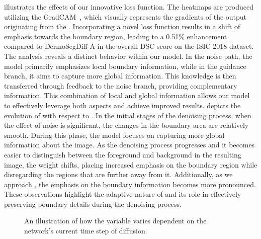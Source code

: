 \documentclass[runningheads]{llncs}
\begin{document}
 illustrates the effects of our innovative loss function. The heatmaps are produced utilizing the GradCAM~\cite{selvaraju2017grad}, which visually represents the gradients of the output originating from the . Incorporating a novel loss function results in a shift of emphasis towards the boundary region, leading to a 0.51\% enhancement compared to DermoSegDiff-A in the overall DSC score on the ISIC 2018 dataset. The analysis reveals a distinct behavior within our model. In the noise path, the model primarily emphasizes local boundary information, while in the guidance branch, it aims to capture more global information. This knowledge is then transferred through feedback to the noise branch, providing complementary information. This combination of local and global information allows our model to effectively leverage both aspects and achieve improved results.  depicts the evolution of  with respect to . In the initial stages of the denoising process, when the effect of noise is significant, the changes in the boundary area are relatively smooth. During this phase, the model focuses on capturing more global information about the image. As the denoising process progresses and it becomes easier to distinguish between the foreground and background in the resulting image, the weight shifts, placing increased emphasis on the boundary region while disregarding the regions that are further away from it. Additionally, as we approach , the emphasis on the boundary information becomes more pronounced. These observations highlight the adaptive nature of  and its role in effectively preserving boundary details during the denoising process.
\begin{figure}[!t]
    \centering
    
    \caption{An illustration of how the  variable varies dependent on the network's current time step of diffusion.} \label{fig:impact-w}
\end{figure}
\end{document}
